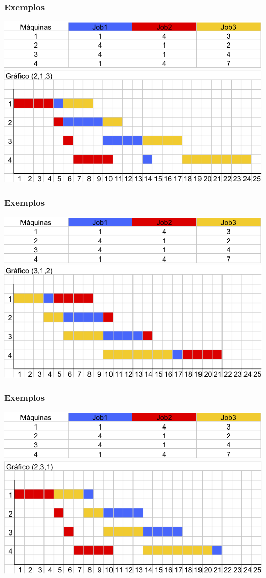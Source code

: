 \documentclass[12pt]{beamer}
\begin{document}
\begin{frame}
	\frametitle{Exemplos}
	\includegraphics[scale=.6]{tab} \\
	\includegraphics[scale=.6]{graph2} 
\end{frame}
\begin{frame}
	\frametitle{Exemplos}
	\includegraphics[scale=.6]{tab} \\
	\includegraphics[scale=.6]{graph3} 
\end{frame}
\begin{frame}
	\frametitle{Exemplos}
	\includegraphics[scale=.6]{tab} \\
	\includegraphics[scale=.6]{graph4} 
\end{frame}
\end{document}
